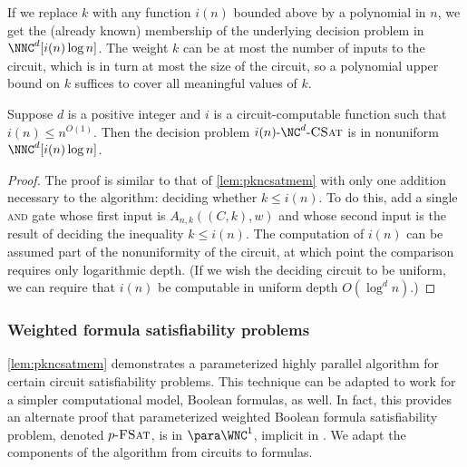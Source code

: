 If we replace $k$ with any function $i(n)$ bounded above by a polynomial in $n$, we get the (already known) membership of the underlying decision problem in $\NNC^d[i(n) \log n]$.
The weight $k$ can be at most the number of inputs to the circuit, which is in turn at most the size of the circuit, so a polynomial upper bound on $k$ suffices to cover all meaningful values of $k$.

\begin{corollary}\label{lem:nncmem}
  Suppose $d$ is a positive integer and $i$ is a circuit-computable function such that $i(n) \leq n^{O(1)}$.
  Then the decision problem $\iNCSAT$ is in nonuniform $\NNC^d[i(n) \log n]$.
\end{corollary}
\begin{proof}
  The proof is similar to that of \autoref{lem:pkncsatmem} with only one addition necessary to the algorithm: deciding whether $k \leq i(n)$.
  To do this, add a single \textsc{and} gate whose first input is $A_{n, k}((C, k), w)$ and whose second input is the result of deciding the inequality $k \leq i(n)$.
  The computation of $i(n)$ can be assumed part of the nonuniformity of the circuit, at which point the comparison requires only logarithmic depth.
  (If we wish the deciding circuit to be uniform, we can require that $i(n)$ be computable in uniform depth $O(\log^d n)$.)
\end{proof}

\subsubsection{Weighted formula satisfiability problems}

%
%
%
\autoref{lem:pkncsatmem} demonstrates a parameterized highly parallel algorithm for certain circuit satisfiability problems.
%
%
%
This technique can be adapted to work for a simpler computational model, Boolean formulas, as well.
In fact, this provides an alternate proof that parameterized weighted Boolean formula satisfiability problem, denoted $p \textnormal{-} \textsc{FSat}$, is in $\para \WNC^1$, implicit in \autocite[Theorem~3.6]{est15}.
%
%
%
We adapt the components of the algorithm from circuits to formulas.
%
%
%


